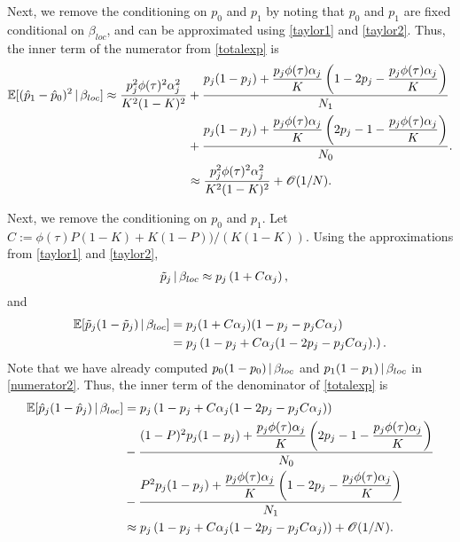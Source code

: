 \documentclass[11pt]{article}
\numberwithin{equation}{section}
\numberwithin{definition}{section}
\numberwithin{thm}{section}
\numberwithin{lemma}{section}
\numberwithin{prop}{section}
\numberwithin{cor}{section}
\numberwithin{hyp}{section}
\begin{document}
Next, we remove the conditioning on $p_0$ and $p_1$ by noting that 
$p_0$ and $p_1$ are fixed conditional on $\beta_{loc}$,
and can be approximated using \ref{taylor1} and \ref{taylor2}.
Thus, the inner term of the numerator from \ref{totalexp} is
\begin{align}
\label{numerator2}
\notag
	\mathbb{E}[(\hat{p}_1 -\hat{p}_0)^2\,|\,\beta_{loc}]
\approx
	\dfrac{p_j^2\phi(\tau)^2\alpha_j^2}{K^2(1-K)^2}
&+
	\dfrac{p_j(1-p_j)
	+
	\dfrac{p_j\phi(\tau)\alpha_j}{K}\left(
	1 - 2p_j - \dfrac{p_j\phi(\tau)\alpha_j}{K}	
	\right)}{N_1}\\
&+	
	\dfrac{p_j(1-p_j)
	+
	\dfrac{p_j\phi(\tau)\alpha_j}{K}\left(
	2p_j -1 - \dfrac{p_j\phi(\tau)\alpha_j}{K}	
	\right)}{N_0}.\nonumber\\
&\approx
	 \dfrac{p_j^2\phi(\tau)^2\alpha_j^2}{K^2(1-K)^2} + \mathscr{O}(1/N).
\end{align}




Next, we remove the conditioning on $p_0$ and $p_1$. 
Let $C:=\phi(\tau)P(1-K) + K(1-P))/(K(1-K))$. 
Using the approximations from \ref{taylor1} and \ref{taylor2},
\begin{align*}
	\tilde{p}_j\,|\,\beta_{loc}
&\approx
	p_j\left(
		1 + C\alpha_j
	\right),
\end{align*}
and
\begin{align*}
	\mathbb{E}[\tilde{p}_j(1-\tilde{p}_j)\,|\,\beta_{loc}]
&=
	p_j(1 + C\alpha_j)(1-p_j-p_jC\alpha_j)\\
&=
	p_j\left(
		1-p_j+C\alpha_j(1-2p_j-p_jC\alpha_j).
	\right).
\end{align*}
Note that we have already computed $p_0(1-p_0)\,|\,\beta_{loc}$
and $p_1(1-p_1)\,|\,\beta_{loc}$ in \ref{numerator2}.
Thus, the inner term of the denominator of \ref{totalexp} is
\begin{align}
\label{denom}
\notag
	\mathbb{E}[\hat{p}_j(1-\hat{p}_j)\,|\,\beta_{loc}]
&= 
	p_j\left(
		1-p_j+C\alpha_j(1-2p_j-p_jC\alpha_j)
	\right)\\\notag
&-
	\dfrac{(1-P)^2p_j(1-p_j)
	+
	\dfrac{p_j\phi(\tau)\alpha_j}{K}\left(
	2p_j -1 - \dfrac{p_j\phi(\tau)\alpha_j}{K}	
	\right)}{N_0}\\
&-
	\dfrac{P^2p_j(1-p_j)
	+
	\dfrac{p_j\phi(\tau)\alpha_j}{K}\left(
	1 - 2p_j - \dfrac{p_j\phi(\tau)\alpha_j}{K}	
	\right)}{N_1}\nonumber\\
&\approx
	p_j\left(
		1-p_j+C\alpha_j(1-2p_j-p_jC\alpha_j)
	\right) + \mathscr{O}(1/N).
\end{align}
\end{document}
